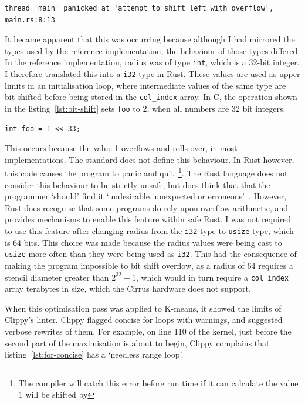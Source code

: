 \begin{code}
\begin{verbatim}
thread 'main' panicked at 'attempt to shift left with overflow', main.rs:8:13
\end{verbatim}
\label{lst:rutsc-bit}
\end{code}

It became apparent that this was occurring because although I had mirrored the types used by the reference implementation, the behaviour of those types differed. In the reference implementation, radius was of type \texttt{int}, which is a 32-bit integer. I therefore translated this into a \texttt{i32} type in Rust. These values are used as upper limits in an initialisation loop, where intermediate values of the same type are bit-shifted before being stored in the \texttt{col\_index} array. In C, the operation shown in the listing~\ref{lst:bit-shift} sets \texttt{foo} to 2, when all numbers are 32 bit integers. 
\begin{code}
\begin{verbatim}
int foo = 1 << 33;
\end{verbatim}
\label{lst:bit-shift}
\end{code}

This occurs because the value 1 overflows and rolls over, in most implementations. The standard does not define this behaviour. In Rust however, this code causes the program to panic and quit~\footnote{The compiler will catch this error before run time if it can calculate the value 1 will be shifted by}. The Rust language does not consider this behaviour to be strictly unsafe, but does think that that the programmer `should' find it `undesirable, unexpected or erroneous'~\cite{rustunsafe}.
However, Rust does recognise that some programs do rely upon overflow arithmetic, and provides mechanisms to enable this feature within safe Rust. I was not required to use this feature after changing radius from the \texttt{i32} type to \texttt{usize} type, which is 64 bits.
This choice was made because the radius values were being cast to \texttt{usize} more often than they were being used as \texttt{i32}. This had the consequence of making the program impossible to bit shift overflow, as a radius of 64 requires a stencil diameter greater than $2^{32}-1$, which would in turn require a \texttt{col\_index} array terabytes in size, which the Cirrus hardware does not support.

When this optimisation pass was applied to K-means, it showed the limits of Clippy's linter. Clippy flagged concise for loops with warnings, and suggested verbose rewrites of them. For example, on line 110 of the kernel, just before the second part of the maximisation is about to begin, Clippy complains that listing~\ref{lst:for-concise} has a `needless range loop'.

